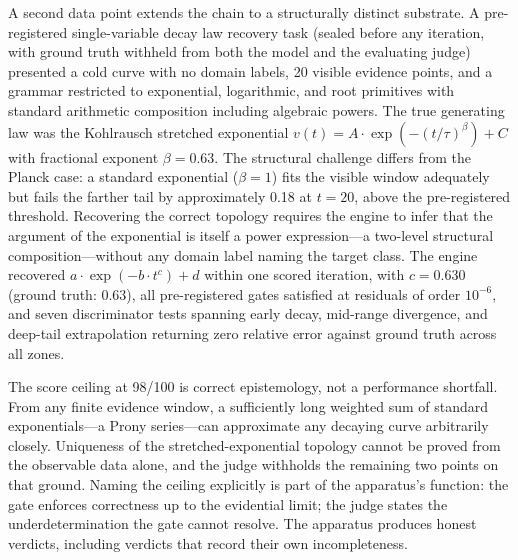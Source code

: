\documentclass[11pt]{article}
\begin{document}
A second data point extends the chain to a structurally distinct substrate. A pre-registered single-variable decay law recovery task (sealed before any iteration, with ground truth withheld from both the model and the evaluating judge) presented a cold curve with no domain labels, 20 visible evidence points, and a grammar restricted to exponential, logarithmic, and root primitives with standard arithmetic composition including algebraic powers. The true generating law was the Kohlrausch stretched exponential $v(t) = A \cdot \exp(-(t/\tau)^{\beta}) + C$ with fractional exponent $\beta = 0.63$. The structural challenge differs from the Planck case: a standard exponential ($\beta = 1$) fits the visible window adequately but fails the farther tail by approximately 0.18 at $t = 20$, above the pre-registered threshold. Recovering the correct topology requires the engine to infer that the argument of the exponential is itself a power expression---a two-level structural composition---without any domain label naming the target class. The engine recovered $a \cdot \exp(-b \cdot t^c) + d$ within one scored iteration, with $c = 0.630$ (ground truth: $0.63$), all pre-registered gates satisfied at residuals of order $10^{-6}$, and seven discriminator tests spanning early decay, mid-range divergence, and deep-tail extrapolation returning zero relative error against ground truth across all zones.

The score ceiling at 98/100 is correct epistemology, not a performance shortfall. From any finite evidence window, a sufficiently long weighted sum of standard exponentials---a Prony series---can approximate any decaying curve arbitrarily closely. Uniqueness of the stretched-exponential topology cannot be proved from the observable data alone, and the judge withholds the remaining two points on that ground. Naming the ceiling explicitly is part of the apparatus's function: the gate enforces correctness up to the evidential limit; the judge states the underdetermination the gate cannot resolve. The apparatus produces honest verdicts, including verdicts that record their own incompleteness.
\end{document}
